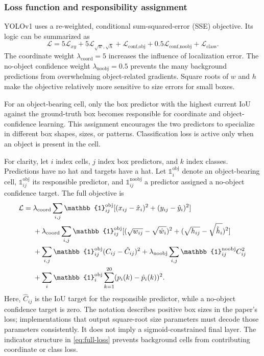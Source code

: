 \documentclass[11pt,a4paper]{article}
\begin{document}
\subsubsection{Loss function and responsibility assignment}
YOLOv1 uses a re-weighted, conditional sum-squared-error (SSE) objective. Its logic can be summarized as
\begin{equation}
  \mathcal{L}=5\mathcal{L}_{xy}+5\mathcal{L}_{\sqrt{w},\sqrt{h}}
  +\mathcal{L}_{\text{conf,obj}}+0.5\mathcal{L}_{\text{conf,noobj}}
  +\mathcal{L}_{\text{class}}.
  \label{eq:loss-summary}
\end{equation}
The coordinate weight $\lambda_{\mathrm{coord}}=5$ increases the influence of localization error. The no-object confidence weight $\lambda_{\mathrm{noobj}}=0.5$ prevents the many background predictions from overwhelming object-related gradients. Square roots of $w$ and $h$ make the objective relatively more sensitive to size errors for small boxes.

For an object-bearing cell, only the box predictor with the highest current IoU against the ground-truth box becomes responsible for coordinate and object-confidence learning. This assignment encourages the two predictors to specialize in different box shapes, sizes, or patterns. Classification loss is active only when an object is present in the cell.

For clarity, let $i$ index cells, $j$ index box predictors, and $k$ index classes. Predictions have no hat and targets have a hat. Let $\mathbb{1}^{\mathrm{obj}}_i$ denote an object-bearing cell, $\mathbb{1}^{\mathrm{obj}}_{ij}$ its responsible predictor, and $\mathbb{1}^{\mathrm{noobj}}_{ij}$ a predictor assigned a no-object confidence target. The full objective is
\begin{align}
\mathcal{L}={}&\lambda_{\mathrm{coord}}\sum_{i,j}\mathbb{1}^{\mathrm{obj}}_{ij}
 [(x_{ij}-\hat{x}_i)^2+(y_{ij}-\hat{y}_i)^2] \notag\\
&+\lambda_{\mathrm{coord}}\sum_{i,j}\mathbb{1}^{\mathrm{obj}}_{ij}
 [(\sqrt{w_{ij}}-\sqrt{\hat{w}_i})^2+(\sqrt{h_{ij}}-\sqrt{\hat{h}_i})^2] \notag\\
&+\sum_{i,j}\mathbb{1}^{\mathrm{obj}}_{ij}(C_{ij}-\hat{C}_{ij})^2
 +\lambda_{\mathrm{noobj}}\sum_{i,j}\mathbb{1}^{\mathrm{noobj}}_{ij}C_{ij}^{2} \notag\\
&+\sum_i\mathbb{1}^{\mathrm{obj}}_i\sum_{k=1}^{20}(p_i(k)-\hat{p}_i(k))^2.
\label{eq:full-loss}
\end{align}
Here, $\hat{C}_{ij}$ is the IoU target for the responsible predictor, while a no-object confidence target is zero. The notation describes positive box sizes in the paper's loss; implementations that output square-root size parameters must decode those parameters consistently. It does not imply a sigmoid-constrained final layer. The indicator structure in \cref{eq:full-loss} prevents background cells from contributing coordinate or class loss.
\end{document}
